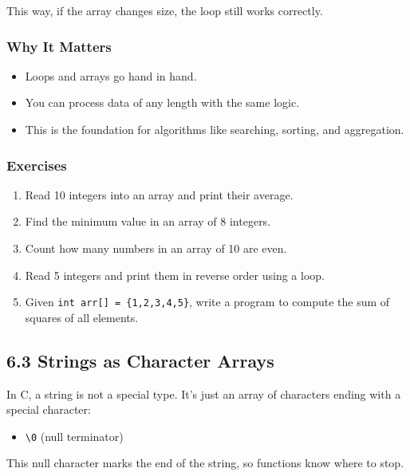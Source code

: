 \documentclass[
  letterpaper,
  DIV=11,
  numbers=noendperiod]{scrreprt}
\providecommand{\tightlist}{%
  \setlength{\itemsep}{0pt}\setlength{\parskip}{0pt}}
\begin{document}
This way, if the array changes size, the loop still works correctly.

\subsubsection{Why It Matters}\label{why-it-matters-25}

\begin{itemize}
\tightlist
\item
  Loops and arrays go hand in hand.
\item
  You can process data of any length with the same logic.
\item
  This is the foundation for algorithms like searching, sorting, and
  aggregation.
\end{itemize}

\subsubsection{Exercises}\label{exercises-26}

\begin{enumerate}
\def\labelenumi{\arabic{enumi}.}
\tightlist
\item
  Read 10 integers into an array and print their average.
\item
  Find the minimum value in an array of 8 integers.
\item
  Count how many numbers in an array of 10 are even.
\item
  Read 5 integers and print them in reverse order using a loop.
\item
  Given \texttt{int\ arr{[}{]}\ =\ \{1,2,3,4,5\}}, write a program to
  compute the sum of squares of all elements.
\end{enumerate}

\subsection{6.3 Strings as Character
Arrays}\label{strings-as-character-arrays}

In C, a string is not a special type. It's just an array of characters
ending with a special character:

\begin{itemize}
\tightlist
\item
  \texttt{\textquotesingle{}\textbackslash{}0\textquotesingle{}} (null
  terminator)
\end{itemize}

This null character marks the end of the string, so functions know where
to stop.
\end{document}

